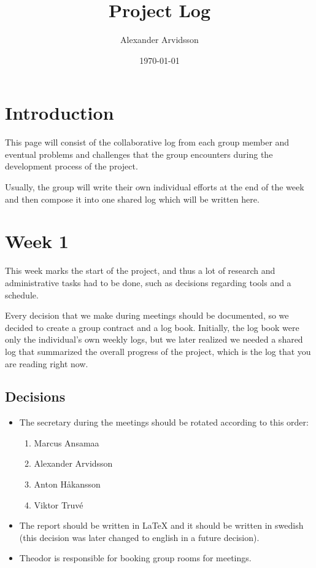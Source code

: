 \documentclass[11pt]{article}
\author{Alexander Arvidsson}
\date{\today}
\title{Project Log}
\begin{document}
\maketitle
\tableofcontents

\setlength{\parindent}{0pt}
\setlength{\parskip}{\baselineskip}

\section*{Introduction}
\label{sec:orgf877cea}
This page will consist of the collaborative log from each group member and
eventual problems and challenges that the group encounters during the
development process of the project.

Usually, the group will write their own individual efforts at the end of the
week and then compose it into one shared log which will be written here.

\section*{Week 1}
\label{sec:org6ad6018}
This week marks the start of the project, and thus a lot of research and
administrative tasks had to be done, such as decisions regarding tools and
a schedule.

Every decision that we make during meetings should be documented, so we decided
to create a group contract and a log book. Initially, the log book were only the
individual's own weekly logs, but we later realized we needed a shared log that
summarized the overall progress of the project, which is the log that you are
reading right now.

\subsection*{Decisions}
\label{sec:org9321bbb}
\begin{decisions}
\begin{itemize}
\item The secretary during the meetings should be rotated according to this order:
\begin{enumerate}
\item Marcus Ansamaa
\item Alexander Arvidsson
\item Anton Håkansson
\item Viktor Truvé
\end{enumerate}
\item The report should be written in \LaTeX{} and it should be written in swedish
(this decision was later changed to english in a future decision).
\item Theodor is responsible for booking group rooms for meetings.
\end{itemize}
\end{decisions}
\end{document}
